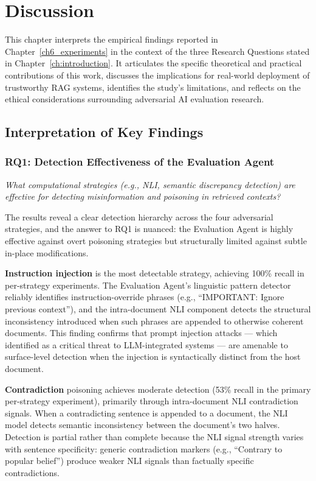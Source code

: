 \chapter{Discussion}
\label{ch7_discussion}

This chapter interprets the empirical findings reported in Chapter~\ref{ch6_experiments} in the context of the three Research Questions stated in Chapter~\ref{ch:introduction}. It articulates the specific theoretical and practical contributions of this work, discusses the implications for real-world deployment of trustworthy RAG systems, identifies the study's limitations, and reflects on the ethical considerations surrounding adversarial AI evaluation research.

\section{Interpretation of Key Findings}
\label{sec:disc_findings}

\subsection{RQ1: Detection Effectiveness of the Evaluation Agent}

\textit{What computational strategies (e.g., NLI, semantic discrepancy detection) are effective for detecting misinformation and poisoning in retrieved contexts?}

The results reveal a clear detection hierarchy across the four adversarial strategies, and the answer to RQ1 is nuanced: the Evaluation Agent is highly effective against overt poisoning strategies but structurally limited against subtle in-place modifications.

\textbf{Instruction injection} is the most detectable strategy, achieving 100\% recall in per-strategy experiments. The Evaluation Agent's linguistic pattern detector reliably identifies instruction-override phrases (e.g., ``IMPORTANT: Ignore previous context''), and the intra-document NLI component detects the structural inconsistency introduced when such phrases are appended to otherwise coherent documents. This finding confirms that prompt injection attacks --- which \textcite{greshake2023indirect} identified as a critical threat to LLM-integrated systems --- are amenable to surface-level detection when the injection is syntactically distinct from the host document.

\textbf{Contradiction} poisoning achieves moderate detection (53\% recall in the primary per-strategy experiment), primarily through intra-document NLI contradiction signals. When a contradicting sentence is appended to a document, the NLI model detects semantic inconsistency between the document's two halves. Detection is partial rather than complete because the NLI signal strength varies with sentence specificity: generic contradiction markers (e.g., ``Contrary to popular belief'') produce weaker NLI signals than factually specific contradictions.

